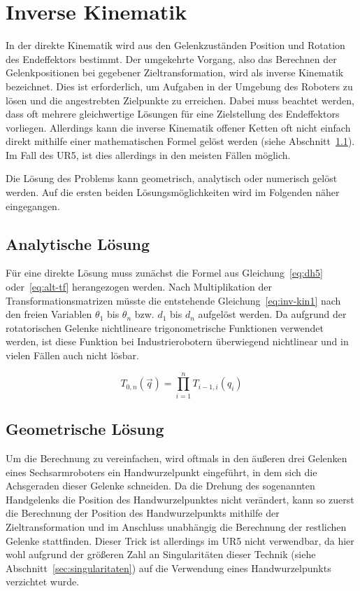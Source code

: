 \cleardoublepage


\chapter{Inverse Kinematik}

In der direkte Kinematik wird aus den Gelenkzuständen Position und Rotation des Endeffektors bestimmt.
Der umgekehrte Vorgang, also das Berechnen der Gelenkpositionen bei gegebener Zieltransformation, wird als inverse Kinematik bezeichnet.
Dies ist erforderlich, um Aufgaben in der Umgebung des Roboters zu lösen und die angestrebten Zielpunkte zu erreichen.
Dabei muss beachtet werden, dass oft mehrere gleichwertige Lösungen für eine Zielstellung des Endeffektors vorliegen.
Allerdings kann die inverse Kinematik offener Ketten oft nicht einfach direkt mithilfe einer mathematischen Formel gelöst werden (siehe Abschnitt~\ref{sec:analytische-losung}).
Im Fall des UR5, ist dies allerdings in den meisten Fällen möglich.

Die Lösung des Problems kann geometrisch, analytisch oder numerisch gelöst werden.
Auf die ersten beiden Lösungsmöglichkeiten wird im Folgenden näher eingegangen.


\section{Analytische Lösung}\label{sec:analytische-losung}

Für eine direkte Lösung muss zunächst die Formel aus Gleichung~\ref{eq:dh5} oder~\ref{eq:alt-tf} herangezogen werden.
Nach Multiplikation der Transformationsmatrizen müsste die entstehende Gleichung~\ref{eq:inv-kin1} nach den freien Variablen $\theta_1$ bis $\theta_n$ bzw. $d_1$ bis $d_n$ aufgelöst werden.
Da aufgrund der rotatorischen Gelenke nichtlineare trigonometrische Funktionen verwendet werden, ist diese Funktion bei Industrierobotern überwiegend nichtlinear und in vielen Fällen auch nicht lösbar.

\begin{equation}
    T_{0,n}(\overrightarrow{q}) = \prod_{i=1}^{n} T_{i-1,i}(q_i)     \label{eq:inv-kin1}
\end{equation}


\section{Geometrische Lösung}\label{sec:geometrische-losung}
Um die Berechnung zu vereinfachen, wird oftmals in den äußeren drei Gelenken eines Sechsarmroboters ein Handwurzelpunkt eingeführt, in dem sich die Achsgeraden dieser Gelenke schneiden.
Da die Drehung des sogenannten Handgelenks die Position des Handwurzelpunktes nicht verändert, kann so zuerst die Berechnung der Position des Handwurzelpunkts mithilfe der Zieltransformation und im Anschluss unabhängig die Berechnung der restlichen Gelenke stattfinden.
Dieser Trick ist allerdings im UR5 nicht verwendbar, da hier wohl aufgrund der größeren Zahl an Singularitäten dieser Technik (siehe Abschnitt~\ref{sec:singularitaten}) auf die Verwendung eines Handwurzelpunkts verzichtet wurde.

